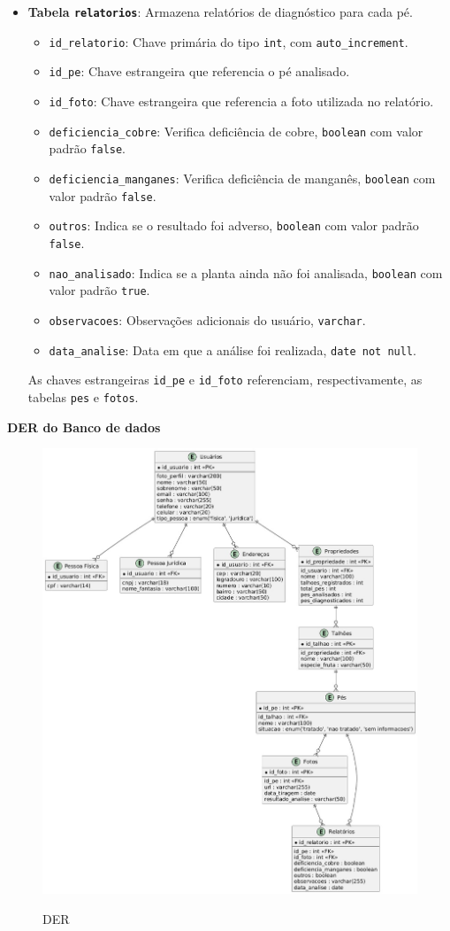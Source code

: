 \begin{itemize}
    \item \textbf{Tabela \texttt{relatorios}}: Armazena relatórios de diagnóstico para cada pé.
    \begin{itemize}
        \item \texttt{id\_relatorio}: Chave primária do tipo \texttt{int}, com \texttt{auto\_increment}.
        \item \texttt{id\_pe}: Chave estrangeira que referencia o pé analisado.
        \item \texttt{id\_foto}: Chave estrangeira que referencia a foto utilizada no relatório.
        \item \texttt{deficiencia\_cobre}: Verifica deficiência de cobre, \texttt{boolean} com valor padrão \texttt{false}.
        \item \texttt{deficiencia\_manganes}: Verifica deficiência de manganês, \texttt{boolean} com valor padrão \texttt{false}.
        \item \texttt{outros}: Indica se o resultado foi adverso, \texttt{boolean} com valor padrão \texttt{false}.
        \item \texttt{nao\_analisado}: Indica se a planta ainda não foi analisada, \texttt{boolean} com valor padrão \texttt{true}.
        \item \texttt{observacoes}: Observações adicionais do usuário, \texttt{varchar}.
        \item \texttt{data\_analise}: Data em que a análise foi realizada, \texttt{date not null}.
    \end{itemize}
    As chaves estrangeiras \texttt{id\_pe} e \texttt{id\_foto} referenciam, respectivamente, as tabelas \texttt{pes} e \texttt{fotos}.
\end{itemize} 
\textbf{DER do Banco de dados}
\begin{figure}[H]
\centering
\caption{DER}
\includegraphics[width=0.7\linewidth]{Illustrations/DER_BD.jpeg}
\label{fig:DER}
\end{figure}


